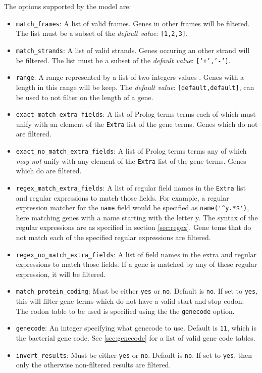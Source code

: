 \documentclass{book}
\begin{document}
The options supported by the model are:
\begin{itemize}
\item \texttt{match\_frames}: A list of valid frames. Genes in other
  frames will be filtered. The list must be a subset of the \emph{default
    value}: \texttt{[1,2,3]}. 
\item \texttt{match\_strands}: A list of valid strands. Genes occuring
  an other strand will be filtered. The list must be a subset of the
  \emph{default value}: \texttt{['+','-']}.
\item \texttt{range}: A range represented by a list of two integers values . Genes
with a length in this range will be keep. The  \emph{default value}: \texttt{[default,default]},
can be used to not filter on the length of a gene.  
\item \texttt{exact\_match\_extra\_fields}: A list of Prolog terms
  terms each of which must unify with an element of 
the \texttt{Extra} list of the gene terms. Genes which do not are filtered. 
\item  \texttt{exact\_no\_match\_extra\_fields}: A list of Prolog
  terms terms any of which \emph{may not} unify with any element of
  the \texttt{Extra} list of the gene terms. Genes which do are
  filtered.
\item \texttt{regex\_match\_extra\_fields}: A list of regular field
  names in the \texttt{Extra} list and regular expressions to match
  those fields.  For example, a regular expression matcher for the
  \texttt{name} field would be specified as \verb|name('^y.*$')|,
  here matching genes with a name starting with the letter y.
  The syntax of the regular expressions are as specified in section
  \ref{sec:regex}.
  Gene tems that do not match each of the specified regular
  expressions are filtered. 
\item \texttt{regex\_no\_match\_extra\_fields}: A list of field names
  in the extra and regular expressions to match those fields. If a
  gene is matched by any of these regular expression, it will be
  filtered.
\item \texttt{match\_protein\_coding}: Must be either \texttt{yes} or
 \texttt{no}. Default is \texttt{no}. 
If set to \texttt{yes}, this
  will filter gene terms which do not have a valid start and stop
  codon. The codon table to be used is specified using the the
  \texttt{genecode} option.
\item \texttt{genecode}: An integer specifying what genecode to use.
  Default is \texttt{11}, which is the bacterial gene code.  See
  \ref{sec:genecode} for a list of valid gene code tables. 
\item \texttt{invert\_results}: Must be either \texttt{yes} or
 \texttt{no}. Default is \texttt{no}. If set to \texttt{yes}, then
 only the otherwise non-filtered results are filtered.
\end{itemize}
\end{document}
